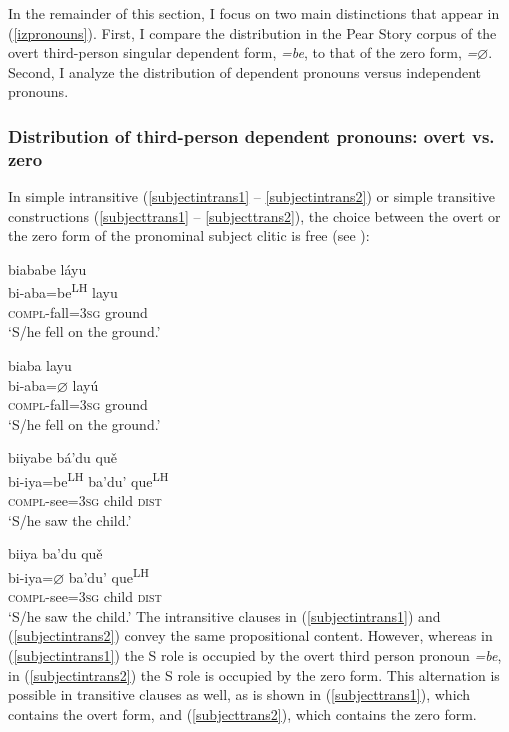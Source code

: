 In the remainder of this section, I focus on two main distinctions that appear  in (\ref{izpronouns}). First, I compare the distribution in the Pear Story corpus of the overt third-person singular dependent form, \textit{=be}, to that of the zero form, \textit{=$\varnothing$}. Second, I analyze the distribution of dependent pronouns versus independent pronouns. 


\subsubsection{Distribution of third-person dependent pronouns: overt vs. zero}

In simple intransitive (\ref{subjectintrans1} -- \ref{subjectintrans2}) or simple transitive constructions (\ref{subjecttrans1} -- \ref{subjecttrans2}), the choice between the overt or the zero form of the pronominal subject clitic is free (see \citet{marlett1996}):

\ea\label{subjectintrans1}
\glll biababe l\'{a}yu \\
bi-aba=be\textsuperscript{LH} layu \\
\textsc{compl}-fall=3\textsc{sg} ground \\
\glt `S/he fell on the ground.'
\z

\ea\label{subjectintrans2}
\glll biaba layu \\
bi-aba=$\varnothing$ lay\'{u} \\
\textsc{compl}-fall=3\textsc{sg} ground \\
\glt `S/he fell on the ground.'
\z

\ea \label{subjecttrans1} 
\glll biiyabe b\'{a}'du qu\v{e}  \\
bi-iya=be\textsuperscript{LH} ba'du' que\textsuperscript{LH}  \\
\textsc{compl}-see=3\textsc{sg} child \textsc{dist}  \\
\glt `S/he saw the child.' 
\z

\ea \label{subjecttrans2} 
\glll biiya ba'du qu\v{e} \\
bi-iya=$\varnothing$ ba'du' que\textsuperscript{LH} \\
\textsc{compl}-see=3\textsc{sg} child \textsc{dist} \\
\glt `S/he saw the child.' 
\z
The intransitive clauses in (\ref{subjectintrans1}) and (\ref{subjectintrans2}) convey the same propositional content. However, whereas in (\ref{subjectintrans1}) the S role is occupied by the overt third person pronoun \textit{=be}, in (\ref{subjectintrans2}) the S role is occupied by the zero form. This alternation is possible in transitive clauses as well, as is shown in (\ref{subjecttrans1}), which contains the overt form, and (\ref{subjecttrans2}), which contains the zero form. 


